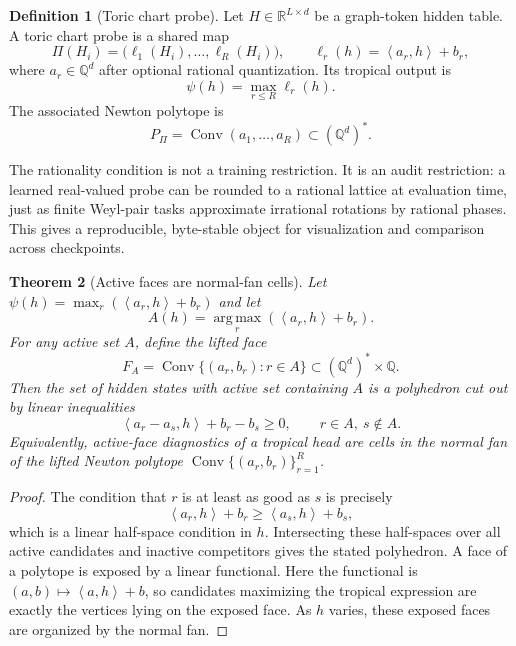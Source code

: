 \documentclass[11pt]{article}
\theoremstyle{definition}
\newtheorem{definition}{Definition}[section]
\theoremstyle{plain}
\newtheorem{theorem}[definition]{Theorem}
\theoremstyle{remark}
\numberwithin{equation}{section}
\newcommand{\R}{\mathbb{R}}
\newcommand{\Q}{\mathbb{Q}}
\newcommand{\argmax}{\operatorname*{arg\,max}}
\newcommand{\Conv}{\operatorname{Conv}}
\newcommand{\ip}[2]{\left\langle #1,#2\right\rangle}
\begin{document}
\begin{definition}[Toric chart probe]
Let $H\in\R^{L\times d}$ be a graph-token hidden table.  A toric chart probe is a shared map
\begin{equation}
  \Pi(H_i)=\bigl(\ell_1(H_i),\ldots,\ell_R(H_i)\bigr),\qquad
  \ell_r(h)=\ip{a_r}{h}+b_r,
\end{equation}
where $a_r\in\Q^d$ after optional rational quantization.  Its tropical output is
\begin{equation}
  \psi(h)=\max_{r\le R}\ell_r(h).
\end{equation}
The associated Newton polytope is
\begin{equation}
  P_\Pi=\Conv(a_1,\ldots,a_R)\subset(\Q^d)^\ast.
\end{equation}
\end{definition}

The rationality condition is not a training restriction.  It is an audit restriction: a learned real-valued probe can be rounded to a rational lattice at evaluation time, just as finite Weyl-pair tasks approximate irrational rotations by rational phases.  This gives a reproducible, byte-stable object for visualization and comparison across checkpoints.

\begin{theorem}[Active faces are normal-fan cells]
\label{thm:active-normal-fan}
Let $\psi(h)=\max_r(\ip{a_r}{h}+b_r)$ and let
\begin{equation}
  A(h)=\argmax_r(\ip{a_r}{h}+b_r).
\end{equation}
For any active set $A$, define the lifted face
\begin{equation}
  F_A=\Conv\{(a_r,b_r):r\in A\}
  \subset(\Q^d)^\ast\times\Q.
\end{equation}
Then the set of hidden states with active set containing $A$ is a polyhedron cut out by linear inequalities
\begin{equation}
  \ip{a_r-a_s}{h}+b_r-b_s\ge0,
  \qquad r\in A,\ s\notin A.
\end{equation}
Equivalently, active-face diagnostics of a tropical head are cells in the normal fan of the lifted Newton polytope $\Conv\{(a_r,b_r)\}_{r=1}^R$.
\end{theorem}

\begin{proof}
The condition that $r$ is at least as good as $s$ is precisely
\begin{equation}
  \ip{a_r}{h}+b_r\ge \ip{a_s}{h}+b_s,
\end{equation}
which is a linear half-space condition in $h$.  Intersecting these half-spaces over all active candidates and inactive competitors gives the stated polyhedron.  A face of a polytope is exposed by a linear functional.  Here the functional is $(a,b)\mapsto \ip{a}{h}+b$, so candidates maximizing the tropical expression are exactly the vertices lying on the exposed face.  As $h$ varies, these exposed faces are organized by the normal fan.
\end{proof}
\end{document}
